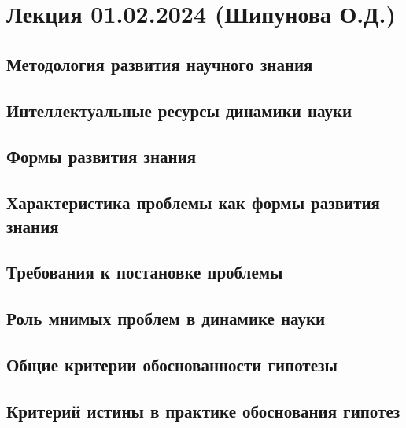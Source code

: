 \documentclass[main.tex]{subfiles}
\begin{document}
\section{Лекция 01.02.2024 (Шипунова О.Д.)}


\subsection{Методология развития научного знания}


\subsection{Интеллектуальные ресурсы динамики науки}


\subsection{Формы развития знания}


\subsection{Характеристика проблемы как формы развития знания}


\subsection{Требования к постановке проблемы}


\subsection{Роль мнимых проблем в динамике науки}


\subsection{Общие критерии обоснованности гипотезы}


\subsection{Критерий истины в практике обоснования гипотез}
\end{document}
